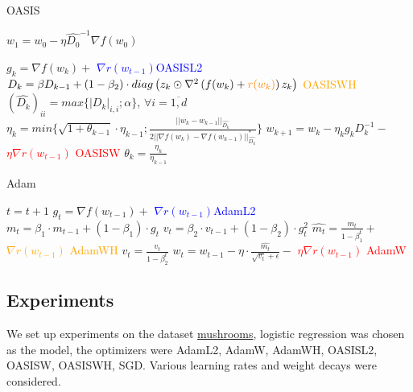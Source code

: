 \documentclass{article}
\begin{document}
\begin{algorithm}[H]
\caption{OASIS}\label{alg:OASIS}
\begin{algorithmic}
    \State $w_1 = w_0 - \eta \hat{D_0}^{-1} \nabla f(w_0)$

    \State $g_k = \nabla f(w_k) +$ \textcolor{blue}{$\nabla r(w_{t-1})$}\hfill \textcolor{blue}{OASISL2} 
    \State $D_k = \beta D_{k-1} + (1-\beta_2) \cdot diag\left( z_k \odot \nabla^2 \left(f(w_k) + \textcolor{orange}{r(w_k)} \right) z_k \right)$ \hfill \textcolor{orange}{OASISWH}
    \State $(\hat{D_k})_{ii} = max \{|D_k|_{i, i} ; \alpha \}$, $\forall i = \overline{1, d}$
    \State $\eta_k = min \{ \sqrt{1 + \theta_{k-1}} \cdot \eta_{k-1}; \frac{||w_k - w_{k-1}||_{\hat{D_k}}}{2 ||\nabla f(w_k) - \nabla f(w_{k-1}) ||_{\hat{D_k}}^* } \}$
    \State $w_{k+1} = w_k - \eta_k g_k D_k^{-1}- $ \textcolor{red}{$\eta \nabla r(w_{t-1})$ } \hfill \textcolor{red}{OASISW} 
    \State $\theta_k = \frac{\eta_k}{\eta_{k-1}}$
    \EndFor
    
\end{algorithmic}
\end{algorithm}

\begin{algorithm}[H]
            \caption{Adam}\label{alg:genAdam}    
            \begin{algorithmic}
            \small{
            \State $t = t+1$
            \State $g_t = \nabla f(w_{t-1}) + $ \textcolor{blue}{$\nabla r(w_{t-1})$}\hfill \textcolor{blue}{AdamL2}
            \State $m_t = \beta_1 \cdot m_{t-1} + (1 - \beta_1) \cdot g_t$
            \State $v_t = \beta_2 \cdot v_{t-1} + (1 - \beta_2) \cdot g_t^2$
            \State $\hat{m_t} = \frac{m_t}{1-\beta_1^t} +$ \textcolor{orange}{$\nabla r(w_{t-1})$} \hfill \textcolor{orange}{AdamWH}
            \State $\hat{v_t} = \frac{v_t}{1-\beta_2^t}$ 
            \State $w_t = w_{t-1} - \eta \cdot \frac{\hat{m_t}}{\sqrt{v_t} + \epsilon} - $ \textcolor{red}{$\eta \nabla r(w_{t-1})$ } \hfill \textcolor{red}{AdamW}
            \EndWhile
            }
\end{algorithmic}
\end{algorithm}


\subsection{Experiments}
We set up experiments on the dataset \href{https://archive.ics.uci.edu/ml/datasets/mushroom}{mushrooms}, logistic regression was chosen as the model, the optimizers were AdamL2, AdamW, AdamWH, OASISL2, OASISW, OASISWH, SGD. Various learning rates and weight decays were considered.
\end{document}

